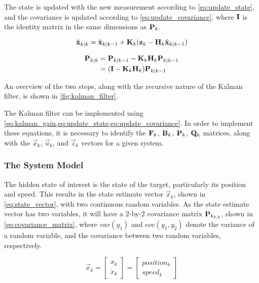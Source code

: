 The state is updated with the new measurement according to \cref{eq:update_state}, and the covariance is updated according to \cref{eq:update_covariance}, where $\mathbf{I}$ is the identity matrix in the same dimensions as $\mathbf{P}_k$.

\begin{equation}
\label{eq:update_state}
  \hat{\mathbf{x}}_{k|k} = \hat{\mathbf{x}}_{k|k-1} + \mathbf{K}_k (\mathbf{z}_k - \mathbf{H}_k \hat{\mathbf{x}}_{k|k-1})
\end{equation}

\begin{equation}
\label{eq:update_covariance}
\begin{split}
    \mathbf{P}_{k|k} &= \mathbf{P}_{k|k-1} - \mathbf{K}_k \mathbf{H}_k \mathbf{P}_{k|k-1} \\
            &= (\mathbf{I} - \mathbf{K}_k \mathbf{H}_k) \mathbf{P}_{k|k-1}
\end{split}
\end{equation}

An overview of the two steps, along with the recursive nature of the Kalman filter, is shown in \cref{fig:kalman_filter}.


The Kalman filter can be implemented using \cref{eq:kalman_gain,eq:update_state,eq:update_covariance}. In order to implement these equations, it is necessary to identify the $\mathbf{F}_k$, $\mathbf{B}_k$, $\mathbf{P}_k$, $\mathbf{Q}_k$ matrices, along with the $\vec{x}_k$, $\vec{u}_k$, and $\vec{z}_k$ vectors for a given system.

\subsubsection{The System Model}
The hidden state of interest is the state of the target, particularly its position and speed. This results in the state estimate vector $\vec{x}_k$, shown in \cref{eq:state_vector}, with two continuous random variables. As the state estimate vector has two variables, it will have a 2-by-2 covariance matrix $\mathbf{P}_{k_{2,2}}$, shown in \cref{eq:covariance_matrix}, where $var(y_1)$ and $cov(y_1,y_2)$ denote the variance of a random variable, and the covariance between two random variables, respectively. 

\begin{equation}
\label{eq:state_vector}
  \vec{x}_k =
     \begin{bmatrix}
      x_k \\
      \dot{x}_k 
     \end{bmatrix}
    =
    \begin{bmatrix}
      position_k \\
      speed_k
     \end{bmatrix}
\end{equation}


